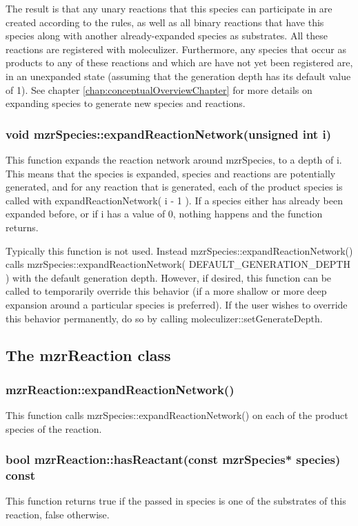 The result is that any unary reactions that this species can
participate in are created according to the rules, as well as all
binary reactions that have this species along with another
already-expanded species as substrates.  All these reactions are
registered with moleculizer.  Furthermore, any species that occur as
products to any of these reactions and which are have not yet been
registered are, in an unexpanded state (assuming that the generation
depth has its default value of 1).  See chapter
\ref{chap:conceptualOverviewChapter} for more details on expanding
species to generate new species and reactions.

\subsubsection{void mzrSpecies::expandReactionNetwork(unsigned int i)}
This function expands the reaction network around mzrSpecies, to a
depth of i.  This means that the species is expanded, species and
reactions are potentially generated, and for any reaction that is
generated, each of the product species is called with
expandReactionNetwork( i - 1 ).  If a species either has already been
expanded before, or if i has a value of 0, nothing happens and the
function returns.  

Typically this function is not used.  Instead
mzrSpecies::expandReactionNetwork() calls
mzrSpecies::expandReactionNetwork( DEFAULT\_GENERATION\_DEPTH ) with the
default generation depth.  However, if desired, this function can be
called to temporarily override this behavior (if a more shallow or
more deep expansion around a particular species is preferred).  If the
user wishes to override this behavior permanently, do so by calling
moleculizer::setGenerateDepth.  

\subsection{The mzrReaction class}
\subsubsection{mzrReaction::expandReactionNetwork()}
This function calls mzrSpecies::expandReactionNetwork() on each of the
product species of the reaction.

\subsubsection{bool mzrReaction::hasReactant(const mzrSpecies*
  species) const}
This function returns true if the passed in species is one of the
substrates of this reaction, false otherwise.  

